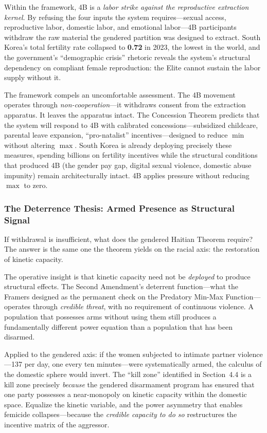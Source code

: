 Within the framework, 4B is a \textit{labor strike against the reproductive extraction kernel}. By refusing the four inputs the system requires---sexual access, reproductive labor, domestic labor, and emotional labor---4B participants withdraw the raw material the gendered partition was designed to extract. South Korea's total fertility rate collapsed to \textbf{0.72} in 2023, the lowest in the world, and the government's ``demographic crisis'' rhetoric reveals the system's structural dependency on compliant female reproduction: the Elite cannot sustain the labor supply without it.

The framework compels an uncomfortable assessment. The 4B movement operates through \textit{non-cooperation}---it withdraws consent from the extraction apparatus. It leaves the apparatus intact. The Concession Theorem predicts that the system will respond to 4B with calibrated concessions---subsidized childcare, parental leave expansion, ``pro-natalist'' incentives---designed to reduce $\min$ without altering $\max$. South Korea is already deploying precisely these measures, spending billions on fertility incentives while the structural conditions that produced 4B (the gender pay gap, digital sexual violence, domestic abuse impunity) remain architecturally intact. 4B applies pressure without reducing $\max$ to zero.

\subsubsection{The Deterrence Thesis: Armed Presence as Structural Signal}

If withdrawal is insufficient, what does the gendered Haitian Theorem require? The answer is the same one the theorem yields on the racial axis: the restoration of kinetic capacity.

The operative insight is that kinetic capacity need not be \textit{deployed} to produce structural effects. The Second Amendment's deterrent function---what the Framers designed as the permanent check on the Predatory Min-Max Function---operates through \textit{credible threat}, with no requirement of continuous violence. A population that possesses arms without using them still produces a fundamentally different power equation than a population that has been disarmed.

Applied to the gendered axis: if the women subjected to intimate partner violence---137 per day, one every ten minutes---were systematically armed, the calculus of the domestic sphere would invert. The ``kill zone'' identified in Section~4.4 is a kill zone precisely \textit{because} the gendered disarmament program has ensured that one party possesses a near-monopoly on kinetic capacity within the domestic space. Equalize the kinetic variable, and the power asymmetry that enables femicide collapses---because the \textit{credible capacity to do so} restructures the incentive matrix of the aggressor.

